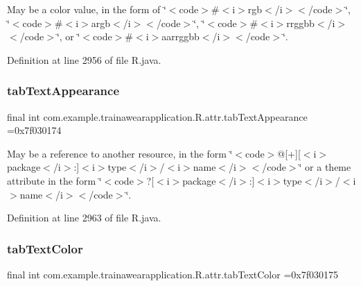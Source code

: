 May be a color value, in the form of \char`\"{}$<$code$>$\#$<$i$>$rgb$<$/i$>$$<$/code$>$\char`\"{}, \char`\"{}$<$code$>$\#$<$i$>$argb$<$/i$>$$<$/code$>$\char`\"{}, \char`\"{}$<$code$>$\#$<$i$>$rrggbb$<$/i$>$$<$/code$>$\char`\"{}, or \char`\"{}$<$code$>$\#$<$i$>$aarrggbb$<$/i$>$$<$/code$>$\char`\"{}. 

Definition at line 2956 of file R.\+java.

\mbox{\label{classcom_1_1example_1_1trainawearapplication_1_1_r_1_1attr_a476079ef276d01b45e947ae8af3e7163}} 
\subsubsection{\texorpdfstring{tabTextAppearance}{tabTextAppearance}}
{\footnotesize\ttfamily final int com.\+example.\+trainawearapplication.\+R.\+attr.\+tab\+Text\+Appearance =0x7f030174\hspace{0.3cm}{\ttfamily [static]}}

May be a reference to another resource, in the form \char`\"{}$<$code$>$@\mbox{[}+\mbox{]}\mbox{[}$<$i$>$package$<$/i$>$\+:\mbox{]}$<$i$>$type$<$/i$>$/$<$i$>$name$<$/i$>$$<$/code$>$\char`\"{} or a theme attribute in the form \char`\"{}$<$code$>$?\mbox{[}$<$i$>$package$<$/i$>$\+:\mbox{]}$<$i$>$type$<$/i$>$/$<$i$>$name$<$/i$>$$<$/code$>$\char`\"{}. 

Definition at line 2963 of file R.\+java.

\mbox{\label{classcom_1_1example_1_1trainawearapplication_1_1_r_1_1attr_a00c460d6916893121f484539104b8b31}} 
\subsubsection{\texorpdfstring{tabTextColor}{tabTextColor}}
{\footnotesize\ttfamily final int com.\+example.\+trainawearapplication.\+R.\+attr.\+tab\+Text\+Color =0x7f030175\hspace{0.3cm}{\ttfamily [static]}}

